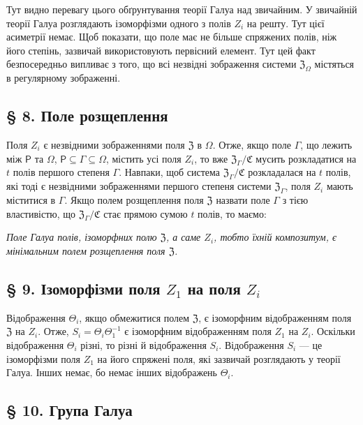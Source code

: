 \documentclass[11pt]{article}
\begin{document}
Тут видно перевагу цього обґрунтування теорії Галуа над звичайним. У звичайній теорії Галуа розглядають ізоморфізми одного з полів \(Z_i\) на решту. Тут цієї асиметрії немає. Щоб показати, що поле має не більше спряжених полів, ніж його степінь, зазвичай використовують первісний елемент. Тут цей факт безпосередньо випливає з того, що всі незвідні зображення системи \(\mathfrak Z_\Omega\) містяться в регулярному зображенні.

\subsection*{§ 8. Поле розщеплення}\label{der-zerfaellungskoerper}

Поля \(Z_i\) є незвідними зображеннями поля \(\mathfrak Z\) в \(\Omega\). Отже, якщо поле \(\Gamma\), що лежить між \(\mathsf P\) та \(\Omega\), \(\mathsf P\subseteq\Gamma\subseteq\Omega\), містить усі поля \(Z_i\), то вже \(\mathfrak Z_\Gamma/\mathfrak C\) мусить розкладатися на \(t\) полів першого степеня \(\Gamma\). Навпаки, щоб система \(\mathfrak Z_\Gamma/\mathfrak C\) розкладалася на \(t\) полів, які тоді є незвідними зображеннями першого степеня системи \(\mathfrak Z_\Gamma\), поля \(Z_i\) мають міститися в \(\Gamma\). Якщо полем розщеплення поля \(\mathfrak Z\) назвати поле \(\Gamma\) з тією властивістю, що \(\mathfrak Z_\Gamma/\mathfrak C\) стає прямою сумою \(t\) полів, то маємо:

\emph{Поле Галуа полів, ізоморфних полю \(\mathfrak Z\), а саме \(Z_i\), тобто їхній композитум, є мінімальним полем розщеплення поля \(\mathfrak Z\).}

\subsection*{§ 9. Ізоморфізми поля \(Z_1\) на поля \(Z_i\)}\label{die-isomorphismen-von-z1-auf-die-zi}

Відображення \(\Theta_i\), якщо обмежитися полем \(\mathfrak Z\), є ізоморфним відображенням поля \(\mathfrak Z\) на \(Z_i\). Отже, \(S_i=\Theta_i\Theta_1^{-1}\) є ізоморфним відображенням поля \(Z_1\) на \(Z_i\). Оскільки відображення \(\Theta_i\) різні, то різні й відображення \(S_i\). Відображення \(S_i\) --- це ізоморфізми поля \(Z_1\) на його спряжені поля, які зазвичай розглядають у теорії Галуа. Інших немає, бо немає інших відображень \(\Theta_i\).

\subsection*{§ 10. Група Галуа}\label{die-galoissche-gruppe}
\end{document}
